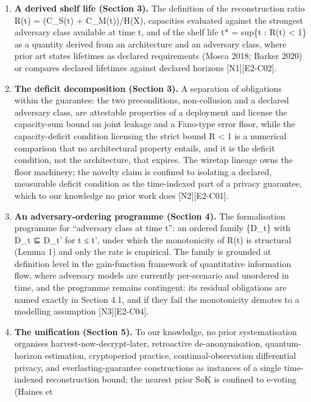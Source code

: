 \documentclass[
  11pt,
]{article}
\providecommand{\tightlist}{%
  \setlength{\itemsep}{0pt}\setlength{\parskip}{0pt}}
\begin{document}
\begin{enumerate}
\def\labelenumi{\arabic{enumi}.}
\tightlist
\item
  \textbf{A derived shelf life (Section 3).} The definition of the
  reconstruction ratio R(t) = (C\_S(t) + C\_M(t))/H(X), capacities
  evaluated against the strongest adversary class available at time t,
  and of the shelf life t* = sup\{t : R(t) \textless{} 1\} as a quantity
  derived from an architecture and an adversary class, where prior art
  states lifetimes as declared requirements (Mosca 2018; Barker 2020) or
  compares declared lifetimes against declared horizons
  {[}N1{]}{[}E2-C02{]}.
\item
  \textbf{The deficit decomposition (Section 3).} A separation of
  obligations within the guarantee: the two preconditions, non-collusion
  and a declared adversary class, are attestable properties of a
  deployment and license the capacity-sum bound on joint leakage and a
  Fano-type error floor, while the capacity-deficit condition licensing
  the strict bound R \textless{} 1 is a numerical comparison that no
  architectural property entails, and it is the deficit condition, not
  the architecture, that expires. The wiretap lineage owns the floor
  machinery; the novelty claim is confined to isolating a declared,
  measurable deficit condition as the time-indexed part of a privacy
  guarantee, which to our knowledge no prior work does
  {[}N2{]}{[}E2-C01{]}.
\item
  \textbf{An adversary-ordering programme (Section 4).} The
  formalisation programme for ``adversary class at time t'': an ordered
  family \{D\_t\} with D\_t ⊆ D\_t' for t ≤ t', under which the
  monotonicity of R(t) is structural (Lemma 1) and only the rate is
  empirical. The family is grounded at definition level in the
  gain-function framework of quantitative information flow, where
  adversary models are currently per-scenario and unordered in time, and
  the programme remains contingent: its residual obligations are named
  exactly in Section 4.1, and if they fail the monotonicity demotes to a
  modelling assumption {[}N3{]}{[}E2-C04{]}.
\item
  \textbf{The unification (Section 5).} To our knowledge, no prior
  systematisation organises harvest-now-decrypt-later, retroactive
  de-anonymisation, quantum-horizon estimation, cryptoperiod practice,
  continual-observation differential privacy, and everlasting-guarantee
  constructions as instances of a single time-indexed reconstruction
  bound; the nearest prior SoK is confined to e-voting (Haines et

\end{enumerate}
\end{document}
